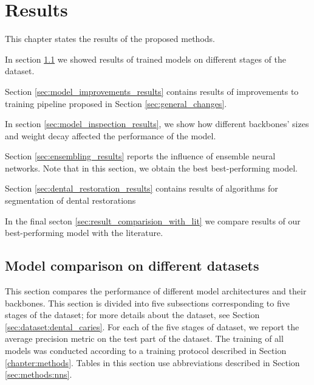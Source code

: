 \chapter{Results}
\label{chapter:results}
This chapter states the results of the proposed methods.

In section \ref{sec:model_comparison} we showed results of trained models on different stages of the dataset.

Section \ref{sec:model_improvements_results} contains results of improvements to training pipeline proposed in Section \ref{sec:general_changes}.

In section \ref{sec:model_inspection_results}, we show how different backbones' sizes and weight decay affected the performance of the model.

Section \ref{sec:ensembling_results} reports the influence of ensemble neural networks. Note that in this section, we obtain the best best-performing model.

Section \ref{sec:dental_restoration_results} contains results of algorithms for segmentation of dental restorations

In the final secton \ref{sec:result_comparision_with_lit} we compare results of our best-performing model with the literature.

\section{Model comparison on different datasets}
\label{sec:model_comparison}
This section compares the performance of different model architectures and their backbones. This section is divided into five subsections corresponding to five stages of the dataset; for more details about the dataset, see Section \ref{sec:dataset:dental_caries}. For each of the five stages of dataset, we report the average precision metric on the test part of the dataset. The training of all models was conducted according to a training protocol described in Section \ref{chapter:methods}. Tables in this section use abbreviations described in Section \ref{sec:methods:nns}.

